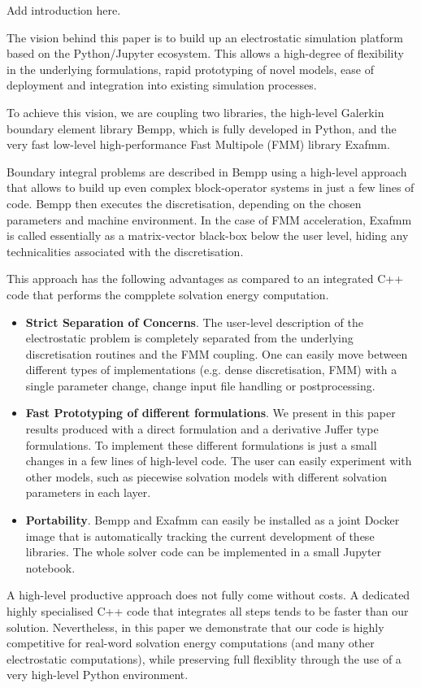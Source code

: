 Add introduction here.


The vision behind this paper is to build up an electrostatic simulation platform based on the Python/Jupyter ecosystem. This allows a high-degree of flexibility in the underlying formulations, rapid prototyping of novel models, ease of deployment and integration into existing simulation processes.

To achieve this vision, we are coupling two libraries, the high-level Galerkin boundary element library Bempp, which is fully developed in Python, and the very fast low-level high-performance Fast Multipole (FMM) library Exafmm. 

Boundary integral problems are described in Bempp using a high-level approach that allows to build up even complex block-operator systems in just a few lines of code. Bempp then executes the discretisation, depending on the chosen parameters and machine environment. In the case of FMM acceleration, Exafmm is called essentially as a matrix-vector black-box below the user level, hiding any technicalities associated with the discretisation.

This approach has the following advantages as compared to an integrated C++ code that performs the compplete solvation energy computation.
\begin{itemize}
	\item \textbf{Strict Separation of Concerns}. The user-level description of the electrostatic problem is completely separated from the underlying discretisation routines and the FMM coupling. One can easily move between different types of implementations (e.g. dense discretisation, FMM) with a single parameter change, change input file handling or postprocessing.
	\item \textbf{Fast Prototyping of different formulations}. We present in this paper results produced with a direct formulation and a derivative Juffer type formulations. To implement these different formulations is just a small changes in a few lines of high-level code. The user can easily experiment with other models, such as piecewise solvation models with different solvation parameters in each layer.
	\item \textbf{Portability}. Bempp and Exafmm can easily be installed as a joint Docker image that is automatically tracking the current development of these libraries. The whole solver code can be implemented in a small Jupyter notebook.
\end{itemize}
A high-level productive approach does not fully come without costs. A dedicated highly specialised C++ code that integrates all steps tends to be faster than our solution. Nevertheless, in this paper we demonstrate that our code is highly competitive for real-word solvation energy computations (and many other electrostatic computations), while preserving full flexiblity through the use of a very high-level Python environment.



